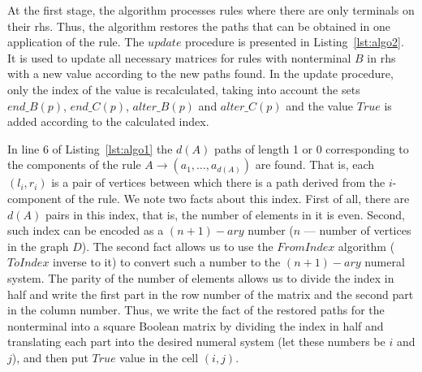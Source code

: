At the first stage, the algorithm processes rules where there are only terminals on their rhs. Thus, the algorithm restores the paths that can be obtained in one application of the rule. The $update$ procedure is presented in Listing~\ref{lst:algo2}. It is used to update all necessary matrices for rules with nonterminal $B$ in rhs with a new value according to the new paths found. In the update procedure, only the index of the value is recalculated, taking into account the sets $end\_B(p)$, $end\_C(p)$, $alter\_B(p)$ and $alter\_C(p)$ and the value $True$ is added according to the calculated index.

In line 6 of Listing~\ref{lst:algo1} the $d(A)$ paths of length 1 or 0 corresponding to the components of the rule $A \rightarrow (a_1, \dots, a_{d(A)})$ are found. That is, each $(l_i, r_i)$ is a pair of vertices between which there is a path derived from the $i$-component of the rule. We note two facts about this index. First of all, there are $d(A)$ pairs in this index, that is, the number of elements in it is even. Second, such index can be encoded as a $(n+1)-ary$ number ($n$ --- number of vertices in the graph $D$). The second fact allows us to use the $FromIndex$ algorithm ($ToIndex$ inverse to it) to convert such a number to the $(n+1)-ary$ numeral system. The parity of the number of elements allows us to divide the index in half and write the first part in the row number of the matrix and the second part in the column number. Thus, we write the fact of the restored paths for the nonterminal into a square Boolean matrix by dividing the index in half and translating each part into the desired numeral system (let these numbers be $i$ and $j$), and then put $True$ value in the cell $(i,j)$.



